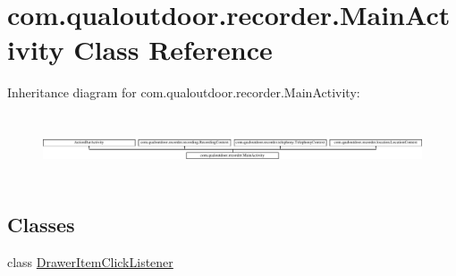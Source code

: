 \hypertarget{classcom_1_1qualoutdoor_1_1recorder_1_1MainActivity}{\section{com.\-qualoutdoor.\-recorder.\-Main\-Activity Class Reference}
\label{classcom_1_1qualoutdoor_1_1recorder_1_1MainActivity}
}
Inheritance diagram for com.\-qualoutdoor.\-recorder.\-Main\-Activity\-:\begin{figure}[H]
\begin{center}
\leavevmode
\includegraphics[height=2.000000cm]{classcom_1_1qualoutdoor_1_1recorder_1_1MainActivity}
\end{center}
\end{figure}
\subsection*{Classes}
\begin{DoxyCompactItemize}
\item 
class \hyperlink{classcom_1_1qualoutdoor_1_1recorder_1_1MainActivity_1_1DrawerItemClickListener}{Drawer\-Item\-Click\-Listener}
\end{DoxyCompactItemize}
